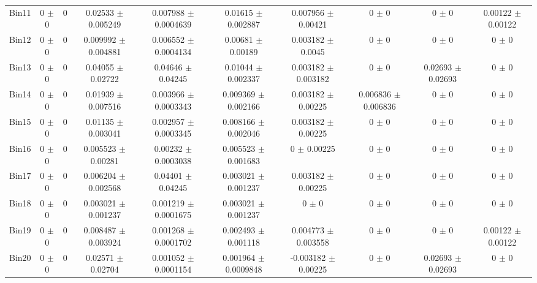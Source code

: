 \begin{tabular}{@{\extracolsep{4pt}}lccccccccc@{}}
     Bin11 & 0 $\pm$ 0 & 0 & 0.02533 $\pm$ 0.005249 & 0.007988 $\pm$ 0.0004639 & 0.01615 $\pm$ 0.002887 & 0.007956 $\pm$ 0.00421 & 0 $\pm$ 0 & 0 $\pm$ 0 & 0.00122 $\pm$ 0.00122 \\ 
     Bin12 & 0 $\pm$ 0 & 0 & 0.009992 $\pm$ 0.004881 & 0.006552 $\pm$ 0.0004134 & 0.00681 $\pm$ 0.00189 & 0.003182 $\pm$ 0.0045 & 0 $\pm$ 0 & 0 $\pm$ 0 & 0 $\pm$ 0 \\ 
     Bin13 & 0 $\pm$ 0 & 0 & 0.04055 $\pm$ 0.02722 & 0.04646 $\pm$ 0.04245 & 0.01044 $\pm$ 0.002337 & 0.003182 $\pm$ 0.003182 & 0 $\pm$ 0 & 0.02693 $\pm$ 0.02693 & 0 $\pm$ 0 \\ 
     Bin14 & 0 $\pm$ 0 & 0 & 0.01939 $\pm$ 0.007516 & 0.003966 $\pm$ 0.0003343 & 0.009369 $\pm$ 0.002166 & 0.003182 $\pm$ 0.00225 & 0.006836 $\pm$ 0.006836 & 0 $\pm$ 0 & 0 $\pm$ 0 \\ 
     Bin15 & 0 $\pm$ 0 & 0 & 0.01135 $\pm$ 0.003041 & 0.002957 $\pm$ 0.0003345 & 0.008166 $\pm$ 0.002046 & 0.003182 $\pm$ 0.00225 & 0 $\pm$ 0 & 0 $\pm$ 0 & 0 $\pm$ 0 \\ 
     Bin16 & 0 $\pm$ 0 & 0 & 0.005523 $\pm$ 0.00281 & 0.00232 $\pm$ 0.0003038 & 0.005523 $\pm$ 0.001683 & 0 $\pm$ 0.00225 & 0 $\pm$ 0 & 0 $\pm$ 0 & 0 $\pm$ 0 \\ 
     Bin17 & 0 $\pm$ 0 & 0 & 0.006204 $\pm$ 0.002568 & 0.04401 $\pm$ 0.04245 & 0.003021 $\pm$ 0.001237 & 0.003182 $\pm$ 0.00225 & 0 $\pm$ 0 & 0 $\pm$ 0 & 0 $\pm$ 0 \\ 
     Bin18 & 0 $\pm$ 0 & 0 & 0.003021 $\pm$ 0.001237 & 0.001219 $\pm$ 0.0001675 & 0.003021 $\pm$ 0.001237 & 0 $\pm$ 0 & 0 $\pm$ 0 & 0 $\pm$ 0 & 0 $\pm$ 0 \\ 
     Bin19 & 0 $\pm$ 0 & 0 & 0.008487 $\pm$ 0.003924 & 0.001268 $\pm$ 0.0001702 & 0.002493 $\pm$ 0.001118 & 0.004773 $\pm$ 0.003558 & 0 $\pm$ 0 & 0 $\pm$ 0 & 0.00122 $\pm$ 0.00122 \\ 
     Bin20 & 0 $\pm$ 0 & 0 & 0.02571 $\pm$ 0.02704 & 0.001052 $\pm$ 0.0001154 & 0.001964 $\pm$ 0.0009848 & -0.003182 $\pm$ 0.00225 & 0 $\pm$ 0 & 0.02693 $\pm$ 0.02693 & 0 $\pm$ 0 \\ 
\hline\hline
  \end{tabular}
